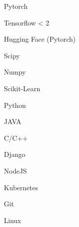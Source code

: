 

\vspace{-.2cm}
\begin{multicols}{4}
	\begin{cvitems}
		\item Pytorch
		\item Tensorflow < 2
		\item Hugging Face (Pytorch)
		\item Scipy
		\item Numpy
		\item Scikit-Learn
	\end{cvitems}
\end{multicols}

\vspace{-.2cm}
\begin{multicols}{5}
	\begin{cvitems}
		\item Python
		\item JAVA
		\item C/C++
		\item Django
        \item NodeJS
        \item Kubernetes
		\item Git
		\item Linux
	\end{cvitems}
\end{multicols}